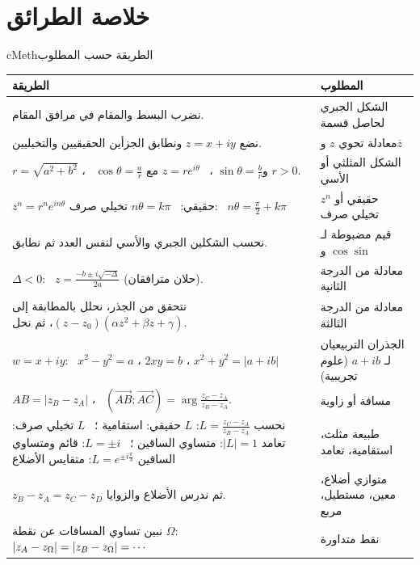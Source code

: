 \documentclass[12pt,a4paper]{article}
\newenvironment{BOX}[2]{\begin{otherlanguage}{english}\begin{arbox}{#1}{#2}}{\end{arbox}\end{otherlanguage}}
\renewcommand{\cdots}{\mathinner{\cdotp\cdotp\cdotp}}
\begin{document}
\clearpage
\section{خلاصة الطرائق}
\begin{BOX}{cMeth}{الطريقة حسب المطلوب}
\begin{center}
\renewcommand{\arraystretch}{1.5}
\begin{tabular}{|p{}|p{}|}\hline
\rowcolor{cSec!12} \textbf{الطريقة} & \textbf{المطلوب}\\\hline
نضرب البسط والمقام في مرافق المقام. & الشكل الجبري لحاصل قسمة\\\hline
نضع $z=x+iy$ ونطابق الجزأين الحقيقيين والتخيليين. & معادلة تحوي $z$ و$\overline{z}$\\\hline
$r=\sqrt{a^2+b^2}$ ، \ $\cos\theta=\frac{a}{r}$ و$\sin\theta=\frac{b}{r}$ ، \ $z=re^{i\theta}$ مع $r>0$. & الشكل المثلثي أو الأسي\\\hline
$z^n=r^ne^{in\theta}$ \newline حقيقي: \ $n\theta=k\pi$ \newline تخيلي صرف: \ $n\theta=\frac{\pi}{2}+k\pi$ & $z^n$ حقيقي أو تخيلي صرف\\\hline
نحسب الشكلين الجبري والأسي لنفس العدد ثم نطابق. & قيم مضبوطة لـ $\cos$ و$\sin$\\\hline
$\Delta<0$: \ $z=\frac{-b\pm i\sqrt{-\Delta}}{2a}$ (حلان مترافقان). & معادلة من الدرجة الثانية\\\hline
نتحقق من الجذر، نحلل بالمطابقة إلى $(z-z_0)(\alpha z^2+\beta z+\gamma)$، ثم نحل. & معادلة من الدرجة الثالثة\\\hline
$w=x+iy$: \ $x^2-y^2=a$ ، $2xy=b$ ، $x^2+y^2=|a+ib|$ & الجذران التربيعيان لـ $a+ib$ (علوم تجريبية)\\\hline
$AB=|z_B-z_A|$ ، \ $(\overrightarrow{AB};\overrightarrow{AC})=\arg\frac{z_C-z_A}{z_B-z_A}$. & مسافة أو زاوية\\\hline
نحسب $L=\frac{z_C-z_A}{z_B-z_A}$: \newline $L$ حقيقي: استقامية ؛ \ $L$ تخيلي صرف: تعامد \newline $|L|=1$: متساوي الساقين ؛ \ $L=\pm i$: قائم ومتساوي الساقين \newline $L=e^{\pm i\frac{\pi}{3}}$: متقايس الأضلاع & طبيعة مثلث، استقامية، تعامد\\\hline
$z_B-z_A=z_C-z_D$ ثم ندرس الأضلاع والزوايا. & متوازي أضلاع، معين، مستطيل، مربع\\\hline
نبين تساوي المسافات عن نقطة $\Omega$: $|z_A-z_\Omega|=|z_B-z_\Omega|=\cdots$ & نقط متداورة\\\hline

\end{tabular}
\end{center}
\end{BOX}
\end{document}
